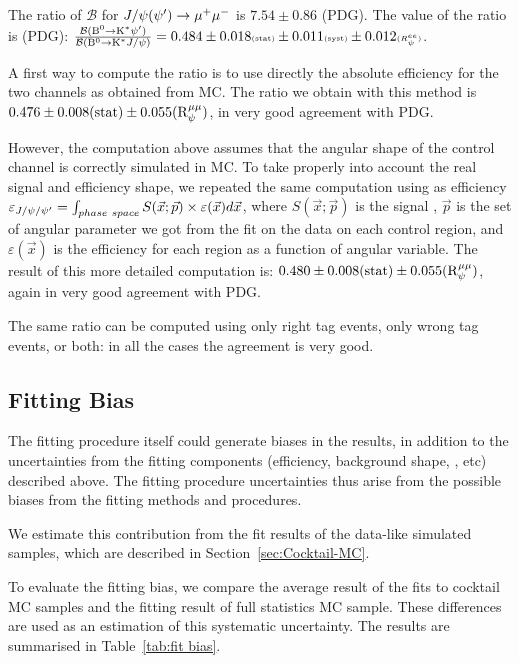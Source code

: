 The ratio of $\mathcal{B}$ for $J/\psi(\psi') \to \mu^{+} \mu^{-}$ is $7.54\pm0.86$ (PDG).
The value of the ratio is (PDG): $\frac{\mathcal{B}({\textrm{B}}{}^{0}\to\textrm{K}^\ast\psi')}{\mathcal{B}({\textrm{B}}{}^{0}\to\textrm{K}^\ast J/\psi)}=0.484 \pm 0.018 \textrm{\tiny{(stat)}} \pm 0.011 \textrm{\tiny{(syst)}} \pm 0.012 \textrm{\tiny{($R^{ee}_\psi$)}}$.

A first way to compute the ratio is to use directly the absolute efficiency for the two channels as obtained from MC.
The ratio we obtain with this method is $0.476\pm 0.008({\rm stat}) \pm 0.055({\rm R}_{\psi}^{\mu\mu})$, in very good agreement with PDG.

However, the computation above assumes that the angular shape of the control channel is correctly simulated in MC.
To take properly into account the real signal and efficiency shape, we repeated the same computation using as efficiency $\varepsilon_{J/\psi/\psi'}=\int_{phase~space}S(\vec{x};\vec{p})\times\varepsilon(\vec{x})d\vec{x}$, where $S(\vec{x};\vec{p})$ is the signal \pdf, $\vec{p}$ is the set of angular parameter we got from the fit on the data on each control region, and $\varepsilon(\vec{x})$ is the efficiency for each region as a function of angular variable.
The result of this more detailed computation is: $0.480\pm 0.008({\rm stat}) \pm 0.055({\rm R}_{\psi}^{\mu\mu})$, again in very good agreement with PDG.

The same ratio can be computed using only right tag events, only wrong tag events, or both: in all the cases the agreement is very good.

\subsection{Fitting Bias}
\label{sec:fitbias-syst}

The fitting procedure itself could generate biases in the results, in addition to the uncertainties from the fitting components (efficiency, background shape, \pdf, etc) described above.
The fitting procedure uncertainties thus arise from the possible biases from the fitting methods and procedures.

We estimate this contribution from the fit results of the data-like simulated samples, which are described in Section~\ref{sec:Cocktail-MC}.

To evaluate the fitting bias, we compare the average result of the fits to cocktail MC samples and the fitting result of full statistics MC sample.
These differences are used as an estimation of this systematic uncertainty.
The results are summarised in Table~\ref{tab:fit bias}.

